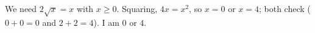We need $2\sqrt x=x$ with $x\ge0$. Squaring, $4x=x^2$, so $x=0$ or $x=4$; both check ($0+0=0$ and $2+2=4$). I am $\boxed{0\text{ or }4}$.
